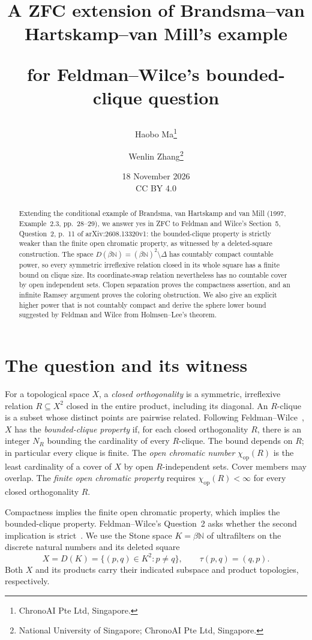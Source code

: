 \documentclass[11pt]{article}
\title{A ZFC extension of Brandsma--van Hartskamp--van Mill's example\par
for Feldman--Wilce's bounded-clique question}
\author{Haobo Ma\thanks{ChronoAI Pte Ltd, Singapore.}\and
Wenlin Zhang\thanks{National University of Singapore; ChronoAI Pte Ltd, Singapore.}}
\date{18 November 2026\\[-1pt]{\small CC BY 4.0}}
\newcommand{\N}{\mathbb N}
\newcommand{\DS}[1]{D(#1)}
\newcommand{\op}{\mathrm{op}}
\begin{document}
\maketitle
\begin{abstract}
Extending the conditional example of Brandsma, van Hartskamp and van Mill
(1997, Example~2.3, pp.~28--29), we answer yes in ZFC to Feldman and
Wilce's Section~5, Question~2, p.~11 of arXiv:2608.13320v1: the
bounded-clique property is strictly weaker than the finite open chromatic
property, as witnessed by a deleted-square construction.
The space $D(\beta\N)=(\beta\N)^2\setminus\Delta$ has countably compact
countable power, so every symmetric irreflexive relation closed in its
whole square has a finite bound on clique size. Its coordinate-swap
relation nevertheless has no countable cover by open independent sets.
Clopen separation proves the compactness assertion, and an infinite
Ramsey argument proves the coloring obstruction. We also give an explicit
higher power that is not countably compact and derive the sphere lower
bound suggested by Feldman and Wilce from Holmsen--Lee's theorem.
\end{abstract}

\section{The question and its witness}
For a topological space $X$, a \emph{closed orthogonality} is a symmetric,
irreflexive relation $R\subseteq X^2$ closed in the entire product,
including its diagonal. An $R$-clique is a subset whose distinct points
are pairwise related. Following Feldman--Wilce~\cite{FW}, $X$ has the
\emph{bounded-clique property} if, for each closed orthogonality $R$,
there is an integer $N_R$ bounding the cardinality of every $R$-clique.
The bound depends on $R$; in particular every clique is finite.
The \emph{open chromatic number} $\chi_\op(R)$ is the least cardinality
of a cover of $X$ by open $R$-independent sets. Cover members may overlap.
The \emph{finite open chromatic property} requires
$\chi_\op(R)<\infty$ for every closed orthogonality $R$.

Compactness implies the finite open chromatic property, which implies
the bounded-clique property. Feldman--Wilce's Question~2 asks whether
the second implication is strict~\cite[Section~5, p.~11]{FW}.
We use the Stone space $K=\beta\N$ of ultrafilters on the discrete
natural numbers and its deleted square
\[
 X=\DS K=\{(p,q)\in K^2:p\ne q\},
 \qquad \tau(p,q)=(q,p).
\]
Both $X$ and its products carry their indicated subspace and product
topologies, respectively.
\end{document}
